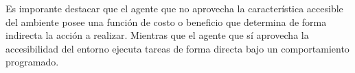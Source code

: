 \documentclass[a4paper,10pt,twocolumn]{article}
\begin{document}
	Es imporante destacar que el agente que no aprovecha la característica accesible del ambiente posee una función de costo o beneficio que determina de forma indirecta la acción a realizar. Mientras que el agente que sí aprovecha la accesibilidad del entorno ejecuta tareas de forma directa bajo un comportamiento programado.





\label{end}
\end{document}
